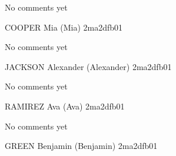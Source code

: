 \documentclass[11pt]{article}
\begin{document}
No comments yet

\newpage

COOPER Mia (Mia) \hfill 2ma2dfb01 \\

\noindent
\begin{minipage}[t]{0.49\textwidth}
\centering
{}
\end{minipage}
\hfill
\begin{minipage}[t]{0.49\textwidth}
\centering
{}
\end{minipage}

No comments yet

\newpage

JACKSON Alexander (Alexander) \hfill 2ma2dfb01 \\

\noindent
\begin{minipage}[t]{0.49\textwidth}
\centering
{}
\end{minipage}
\hfill
\begin{minipage}[t]{0.49\textwidth}
\centering
{}
\end{minipage}

No comments yet

\newpage

RAMIREZ Ava (Ava) \hfill 2ma2dfb01 \\

\noindent
\begin{minipage}[t]{0.49\textwidth}
\centering
{}
\end{minipage}
\hfill
\begin{minipage}[t]{0.49\textwidth}
\centering
{}
\end{minipage}

No comments yet

\newpage

GREEN Benjamin (Benjamin) \hfill 2ma2dfb01 \\

\noindent
\begin{minipage}[t]{0.49\textwidth}
\centering
{}
\end{minipage}
\hfill
\begin{minipage}[t]{0.49\textwidth}
\centering
{}
\end{minipage}
\end{document}
